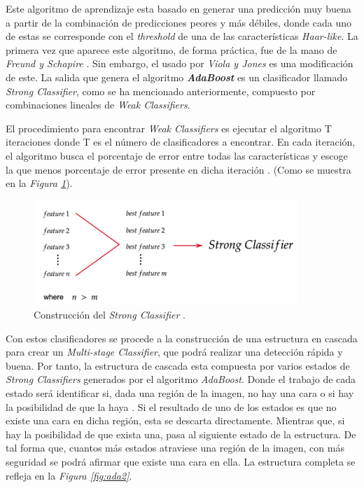 Este algoritmo de aprendizaje esta basado en generar una predicción muy buena a partir de la combinación de predicciones peores y más débiles, donde cada uno de estas se corresponde con el \textit{threshold} de una de las características \textit{Haar-like}. La primera vez que aparece este algoritmo, de forma práctica, fue de la mano de \textit{Freund y Schapire} \cite{adaboost1}. Sin embargo, el usado por \textit{Viola y Jones} es una modificación de este. La salida que genera el algoritmo \textbf{\textit{AdaBoost}} es un clasificador llamado \textit{Strong Classifier}, como se ha mencionado anteriormente, compuesto por combinaciones lineales de \textit{Weak Classifiers}. 

El procedimiento para encontrar \textit{Weak Classifiers} es ejecutar el algoritmo T iteraciones donde T es el número de clasificadores a encontrar. En cada iteración, el algoritmo busca el porcentaje de error entre todas las características y escoge la que menos porcentaje de error presente en dicha iteración \cite{adaboost2}. (Como se muestra en la \textit{Figura \ref{fig:ada1}}). 

\begin{figure}[htp]
	\centering
	\includegraphics[width=10cm]{imagenes/ada1.png}
	\caption{Construcción del \textit{Strong Classifier} \cite{adaboost2}.}
	\label{fig:ada1}
\end{figure}

Con estos clasificadores se procede a la construcción de una estructura en cascada para crear un \textit{Multi-stage Classifier}, que podrá realizar una detección rápida y buena. Por tanto, la estructura de cascada esta compuesta por varios estados de \textit{Strong Classifiers} generados por el algoritmo \textit{AdaBoost}. Donde el trabajo de cada estado será identificar si, dada una región de la imagen, no hay una cara o si hay la posibilidad de que la haya \cite{adaboost1}. Si el resultado de uno de los estados es que no existe una cara en dicha región, esta se descarta directamente. Mientras que, si hay la posibilidad de que exista una, pasa al siguiente estado de la estructura. De tal forma que, cuantos más estados atraviese una región de la imagen, con más seguridad se podrá afirmar que existe una cara en ella. La estructura completa se refleja en la \textit{Figura \ref{fig:ada2}}.

